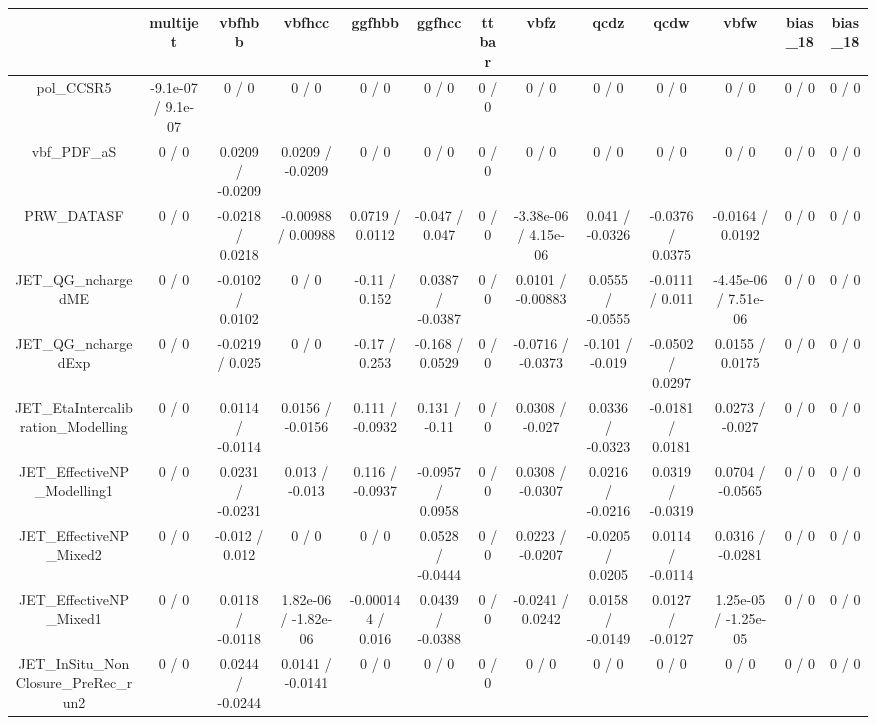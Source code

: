 \documentclass[10pt]{article}
\begin{document}
\begin{table}[htbp]
\begin{center}
\begin{tabular}{|c|c|c|c|c|c|c|c|c|c|c|c|c|}
\hline 
      & multijet      & vbfhbb      & vbfhcc      & ggfhbb      & ggfhcc      & ttbar      & vbfz      & qcdz      & qcdw      & vbfw      & bias_18      & bias_18 \\ 
\hline 
  pol_CCSR5 & -9.1e-07 / 9.1e-07 & 0 / 0 & 0 / 0 & 0 / 0 & 0 / 0 & 0 / 0 & 0 / 0 & 0 / 0 & 0 / 0 & 0 / 0 & 0 / 0 & 0 / 0 \\ 
  vbf_PDF_aS & 0 / 0 & 0.0209 / -0.0209 & 0.0209 / -0.0209 & 0 / 0 & 0 / 0 & 0 / 0 & 0 / 0 & 0 / 0 & 0 / 0 & 0 / 0 & 0 / 0 & 0 / 0 \\ 
  PRW_DATASF & 0 / 0 & -0.0218 / 0.0218 & -0.00988 / 0.00988 & 0.0719 / 0.0112 & -0.047 / 0.047 & 0 / 0 & -3.38e-06 / 4.15e-06 & 0.041 / -0.0326 & -0.0376 / 0.0375 & -0.0164 / 0.0192 & 0 / 0 & 0 / 0 \\ 
  JET_QG_nchargedME & 0 / 0 & -0.0102 / 0.0102 & 0 / 0 & -0.11 / 0.152 & 0.0387 / -0.0387 & 0 / 0 & 0.0101 / -0.00883 & 0.0555 / -0.0555 & -0.0111 / 0.011 & -4.45e-06 / 7.51e-06 & 0 / 0 & 0 / 0 \\ 
  JET_QG_nchargedExp & 0 / 0 & -0.0219 / 0.025 & 0 / 0 & -0.17 / 0.253 & -0.168 / 0.0529 & 0 / 0 & -0.0716 / -0.0373 & -0.101 / -0.019 & -0.0502 / 0.0297 & 0.0155 / 0.0175 & 0 / 0 & 0 / 0 \\ 
  JET_EtaIntercalibration_Modelling & 0 / 0 & 0.0114 / -0.0114 & 0.0156 / -0.0156 & 0.111 / -0.0932 & 0.131 / -0.11 & 0 / 0 & 0.0308 / -0.027 & 0.0336 / -0.0323 & -0.0181 / 0.0181 & 0.0273 / -0.027 & 0 / 0 & 0 / 0 \\ 
  JET_EffectiveNP_Modelling1 & 0 / 0 & 0.0231 / -0.0231 & 0.013 / -0.013 & 0.116 / -0.0937 & -0.0957 / 0.0958 & 0 / 0 & 0.0308 / -0.0307 & 0.0216 / -0.0216 & 0.0319 / -0.0319 & 0.0704 / -0.0565 & 0 / 0 & 0 / 0 \\ 
  JET_EffectiveNP_Mixed2 & 0 / 0 & -0.012 / 0.012 & 0 / 0 & 0 / 0 & 0.0528 / -0.0444 & 0 / 0 & 0.0223 / -0.0207 & -0.0205 / 0.0205 & 0.0114 / -0.0114 & 0.0316 / -0.0281 & 0 / 0 & 0 / 0 \\ 
  JET_EffectiveNP_Mixed1 & 0 / 0 & 0.0118 / -0.0118 & 1.82e-06 / -1.82e-06 & -0.000144 / 0.016 & 0.0439 / -0.0388 & 0 / 0 & -0.0241 / 0.0242 & 0.0158 / -0.0149 & 0.0127 / -0.0127 & 1.25e-05 / -1.25e-05 & 0 / 0 & 0 / 0 \\ 
  JET_InSitu_NonClosure_PreRec_run2 & 0 / 0 & 0.0244 / -0.0244 & 0.0141 / -0.0141 & 0 / 0 & 0 / 0 & 0 / 0 & 0 / 0 & 0 / 0 & 0 / 0 & 0 / 0 & 0 / 0 & 0 / 0 \\ 

\end{tabular}
\end{center}
\end{table}
\end{document}
